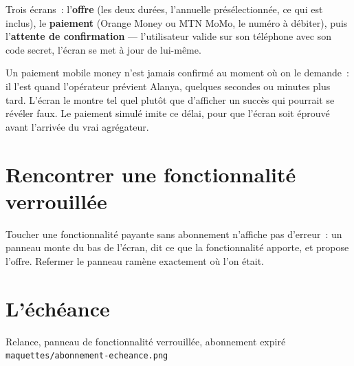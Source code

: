 Trois écrans~: l'\textbf{offre} (les deux durées, l'annuelle présélectionnée, ce qui est
inclus), le \textbf{paiement} (Orange Money ou MTN MoMo, le numéro à débiter), puis
l'\textbf{attente de confirmation} --- l'utilisateur valide sur son téléphone avec son code
secret, l'écran se met à jour de lui-même.

\begin{note}
Un paiement mobile money n'est jamais confirmé au moment où on le demande~: il l'est quand
l'opérateur prévient Alanya, quelques secondes ou minutes plus tard. L'écran le montre tel
quel plutôt que d'afficher un succès qui pourrait se révéler faux. Le paiement simulé imite
ce délai, pour que l'écran soit éprouvé avant l'arrivée du vrai agrégateur.
\end{note}

\section{Rencontrer une fonctionnalité verrouillée}

Toucher une fonctionnalité payante sans abonnement n'affiche pas d'erreur~: un panneau monte
du bas de l'écran, dit ce que la fonctionnalité apporte, et propose l'offre. Refermer le
panneau ramène exactement où l'on était.

\section{L'échéance}

\begin{center}
    {Relance, panneau de fonctionnalité verrouillée, abonnement expiré\\
     \texttt{maquettes/abonnement-echeance.png}}
\end{center}

\begin{center}
\end{center}

